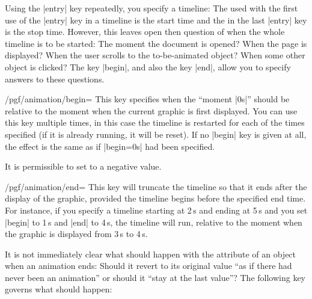 Using the |entry| key repeatedly, you specify a timeline: The
 used with the first use of the |entry| key in a timeline
is the start time and the  in the last |entry| key is the
stop time. However, this leaves open then question of when the whole
timeline is to be started: The moment the document is opened? When the
page is displayed? When the user scrolls to the to-be-animated object?
When some other object is clicked? The key |begin|, and also the key
|end|, allow you to specify answers to these questions.

\begin{key}{/pgf/animation/begin=}
  This key specifies when the ``moment |0s|'' should be relative to
  the moment when the current graphic is first displayed. You can use
  this key multiple times, in this case the timeline is restarted for
  each of the times specified (if it is already running, it will be
  reset). If no |begin| key is given at all, the effect is the same as
  if |begin=0s| had been specified.

  It is permissible to set  to a negative value.
\end{key}

\begin{key}{/pgf/animation/end=}
  This key will truncate the timeline so that it ends 
  after the display of the graphic, provided the timeline begins
  before the specified end time. For instance, if you specify a
  timeline starting at 2\,s and ending at 5\,s and you set |begin| to
  1\,s and |end| to 4\,s, the timeline will run, relative to the moment
  when the graphic is displayed from 3\,s to 4\,s.
  
\begin{codeexample}[width=3cm]
\end{codeexample}
\end{key}

It is not immediately clear what should happen with the attribute of
an object when an animation ends: Should it revert to its original
value ``as if there had never been an animation'' or should it ``stay
at the last value''? The following key governs what should happen:

